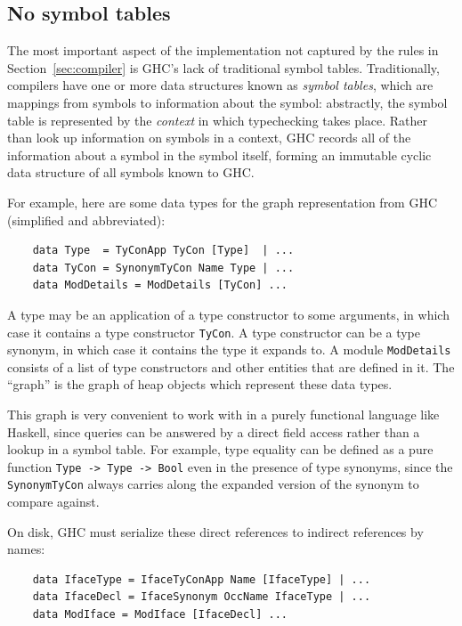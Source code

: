 \subsection{No symbol tables}
\label{sec:no-symbol-tables}

The most important aspect of the implementation not captured by
the rules in Section~\ref{sec:compiler} is GHC's lack of traditional
symbol tables.
Traditionally, compilers have one or more data structures known as
\emph{symbol tables}, which are mappings from symbols to information
about the symbol: abstractly, the symbol table is represented by
the \emph{context} in which typechecking takes place.
Rather than look up information on symbols in a
context, GHC records all of the information about a symbol in
the symbol itself, forming an immutable cyclic data structure of
all symbols known to GHC\@.

For example, here are
some data types for the graph representation from GHC (simplified
and abbreviated):

\begin{lstlisting}
    data Type  = TyConApp TyCon [Type]  | ...
    data TyCon = SynonymTyCon Name Type | ...
    data ModDetails = ModDetails [TyCon] ...
\end{lstlisting}
%
A type may be an application of a type constructor to some arguments, in which
case it contains a type constructor \verb|TyCon|.  A type constructor
can be a type synonym, in which case it contains the type it expands
to.  A module \verb|ModDetails| consists of a list of type constructors
and other entities that are defined in it.  The ``graph'' is the graph of
heap objects which represent these data types.

This graph is very convenient to work with in a purely functional
language like Haskell, since queries can be answered by a direct field
access rather than a lookup in a symbol table.  For example, type
equality can be defined as a pure function \verb|Type -> Type -> Bool|
even in the presence of type synonyms, since the \verb|SynonymTyCon|
always carries along the expanded version of the synonym to compare
against.

On disk, GHC must serialize these direct references to indirect references
by names:

\begin{lstlisting}
    data IfaceType = IfaceTyConApp Name [IfaceType] | ...
    data IfaceDecl = IfaceSynonym OccName IfaceType | ...
    data ModIface = ModIface [IfaceDecl] ...
\end{lstlisting}

